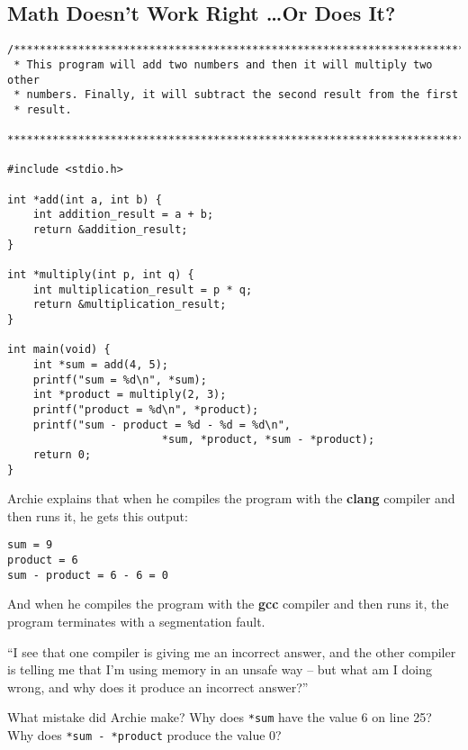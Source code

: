 \subsection{Math Doesn't Work Right \dots Or Does It?} \label{subsec:danglingPointers}

\transitionone

\begin{lstlisting}
/***********************************************************************
 * This program will add two numbers and then it will multiply two other
 * numbers. Finally, it will subtract the second result from the first
 * result.
 ***********************************************************************/

#include <stdio.h>

int *add(int a, int b) {
    int addition_result = a + b;
    return &addition_result;
}

int *multiply(int p, int q) {
    int multiplication_result = p * q;
    return &multiplication_result;
}

int main(void) {
    int *sum = add(4, 5);
    printf("sum = %d\n", *sum);
    int *product = multiply(2, 3);
    printf("product = %d\n", *product);
    printf("sum - product = %d - %d = %d\n",
                        *sum, *product, *sum - *product);
    return 0;
}
\end{lstlisting}

Archie explains that when he compiles the program with the \textbf{clang} compiler and then runs it, he gets this output:

\begin{verbatim}
sum = 9
product = 6
sum - product = 6 - 6 = 0
\end{verbatim}

And when he compiles the program with the \textbf{gcc} compiler and then runs it, the program terminates with a segmentation fault.

``I see that one compiler is giving me an incorrect answer, and the other compiler is telling me that I'm using memory in an unsafe way -- but what am I doing wrong, and why does it produce an incorrect answer?''

What mistake did Archie make?
Why does \lstinline{*sum} have the value 6 on line 25?
Why does \lstinline{*sum - *product} produce the value 0?
\begin{description}
\end{description}
